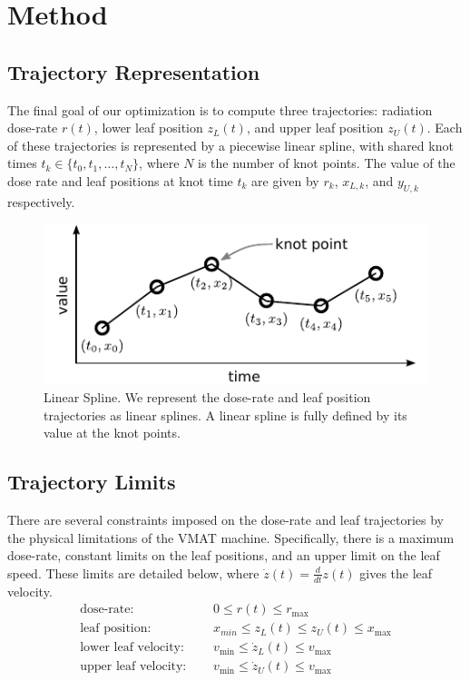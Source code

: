 \section{Method}


\subsection{Trajectory Representation}

The final goal of our optimization is to compute three trajectories:
radiation dose-rate $r(t)$, lower leaf position $z_L(t)$, and upper leaf position $z_U(t)$.
Each of these trajectories is represented by a piecewise linear spline,
with shared knot times $t_k \in \{t_0, t_1, \dots, t_N\}$, where $N$ is the number of knot points.
The value of the dose rate and leaf positions at knot time $t_k$ are given by
$r_k$, $x_{L,k}$, and $y_{U,k}$ respectively.

\begin{figure}
  \centering
  \includegraphics{fig/linearSpline.pdf}
  \caption{Linear Spline. We represent the dose-rate and leaf position trajectories as linear
           splines. A linear spline is fully defined by its value at the knot points. }
  \label{fig:linearSpline}
\end{figure}

\subsection{Trajectory Limits}

There are several constraints imposed on the dose-rate and leaf trajectories
by the physical limitations of the VMAT machine. Specifically, there is a maximum dose-rate,
constant limits on the leaf positions, and an upper limit on the leaf speed.
These limits are detailed below, where $\dot{z}(t) = \tfrac{d}{dt}z(t)$ gives the leaf velocity.
\begin{align}
  \text{dose-rate: }& \quad 0 \leq r(t) \leq r_\text{max}
      \label{eqn:FirstTrajectoryConstraint}\\
  \text{leaf position: }& \quad x_{min} \leq z_L(t) \leq z_U(t) \leq x_\text{max} \\
  \text{lower leaf velocity: }& \quad v_\text{min} \leq \dot{z}_L(t) \leq v_\text{max} \\
  \text{upper leaf velocity: }& \quad v_\text{min} \leq \dot{z}_U(t) \leq v_\text{max}
      \label{eqn:LastTrajectoryConstraint}
\end{align}

